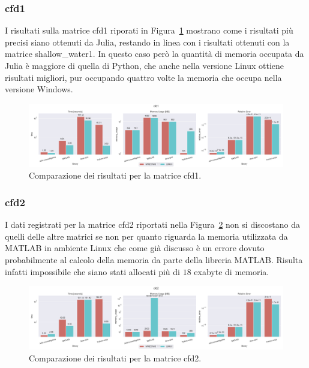 \documentclass[a4paper, 12pt]{article}
\begin{document}
\subsubsection{cfd1}
I risultati sulla matrice cfd1 riporati in Figura~\ref{fig:cfd1} mostrano come i
risultati più precisi siano ottenuti da Julia, restando in linea con i risultati
ottenuti con la matrice shallow\_water1. In questo caso però la quantità di
memoria occupata da Julia è maggiore di quella di Python, che anche nella
versione Linux ottiene risultati migliori, pur occupando quattro volte la
memoria che occupa nella versione Windows.
\begin{figure}[ht]
\includegraphics[width=\textwidth]{cfd1}
\caption{Comparazione dei risultati per la matrice cfd1.}
\label{fig:cfd1}
\end{figure}
\subsubsection{cfd2}
I dati registrati per la matrice cfd2 riportati nella Figura~\ref{fig:cfd2} non
si discostano da quelli delle altre matrici se non per quanto riguarda la
memoria utilizzata da MATLAB in ambiente Linux che come già discusso è un errore
dovuto probabilmente al calcolo della memoria da parte della libreria MATLAB.
Risulta infatti impossibile che siano stati allocati più di $18$ exabyte di
memoria.
\begin{figure}[ht]
\includegraphics[width=\textwidth]{cfd2}
\caption{Comparazione dei risultati per la matrice cfd2.}
\label{fig:cfd2}
\end{figure}
\end{document}
